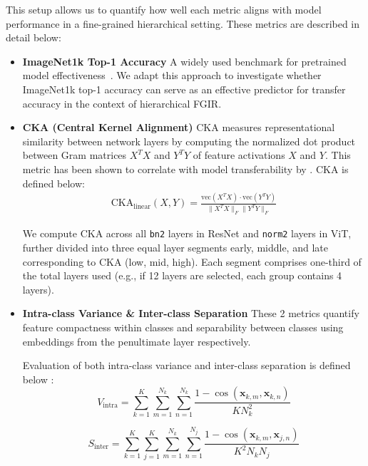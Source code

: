 \documentclass[10pt,twocolumn]{article}
\begin{document}
This setup allows us to quantify how well each metric aligns with model performance in a fine-grained hierarchical setting. These metrics are described in detail below:
\begin{itemize} [topsep=3pt, itemsep=2pt, parsep=1pt]
\item \textbf{ImageNet1k Top-1 Accuracy}
A widely used benchmark for pretrained model effectiveness~\cite{kornblith_better_2019, nayman_diverse_2022}. We adapt this approach to investigate whether ImageNet1k top-1 accuracy can serve as an effective predictor for transfer accuracy in the context of hierarchical FGIR.

\item \textbf{CKA (Central Kernel Alignment)} \cite{kornblith_why_2021}
CKA measures representational similarity between network layers by computing the normalized dot product between Gram matrices \(X^T X\) and \(Y^T Y\) of feature activations \(X\) and \(Y\). This metric has been shown to correlate with model transferability by \cite{nayman_diverse_2022}.
CKA is defined below:
    \begin{align*}
        \mathrm{CKA}_{\text{linear}}(X, Y) = \frac{\mathrm{vec}(X^T X) \cdot \mathrm{vec}(Y^T Y)}{ \|X^T X\|_F \|Y^T Y\|_F }
        \label{eq:cka}
    \end{align*}

We compute CKA across all \texttt{bn2} layers in ResNet and \texttt{norm2} layers in ViT, further divided into three equal layer segments early, middle, and late corresponding to CKA (low, mid, high). Each segment comprises one-third of the total layers used (e.g., if 12 layers are selected, each group contains 4 layers).

\item \textbf{Intra-class Variance \& Inter-class Separation}\cite{islam_broad_2021} 
These 2 metrics quantify feature compactness within classes and separability between classes using embeddings from the penultimate layer respectively.

Evaluation of both intra-class variance and inter-class separation is defined below \cite{kornblith_why_2021}:
    \begin{equation}
        V_{\text{intra}} = \sum_{k=1}^{K} \sum_{m=1}^{N_k} \sum_{n=1}^{N_k} \frac{1 - \cos(\mathbf{x}_{k,m}, \mathbf{x}_{k,n})}{K N_k^2}
        \label{eq:intra}
    \end{equation}

    \begin{equation}
        S_{\text{inter}} = \sum_{k=1}^{K} \sum_{j=1}^{K} \sum_{m=1}^{N_k} \sum_{n=1}^{N_j} \frac{1 - \cos(\mathbf{x}_{k,m}, \mathbf{x}_{j,n})}{K^2 N_k N_j}
        \label{eq:inter}
    \end{equation}


\end{itemize}
\end{document}
